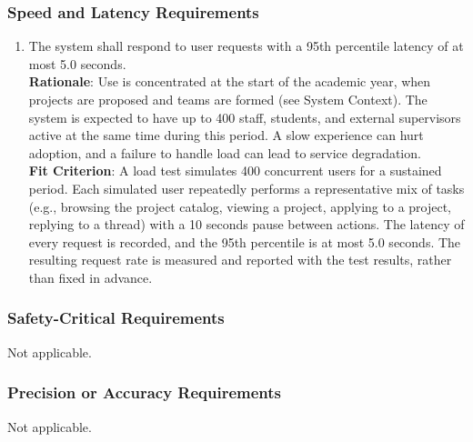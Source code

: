 \documentclass[12pt]{article}
\newcommand{\descriptiveid}[1]{\texttt{\detokenize{#1}}}
\newcommand{\idlabel}[1]{%
  \phantomsection%
  \hypertarget{#1}{\descriptiveid{#1}}
}
\newcounter{tin}
\newcommand{\tailPercentile}{95th}
\newcommand{\tailLatency}{5.0 seconds}
\newcommand{\concurrentUsers}{400}
\newcommand{\thinkTime}{10 seconds}
\begin{document}
  \subsubsection{Speed and Latency Requirements}
  \begin{enumerate}[label=PR-SL\arabic*, ref=PR-SL\arabic*]
    \item[]\idlabel{NFR_PerfTail}\label{NFR_PerfTail} The system shall respond to user requests with a \tailPercentile{} percentile latency of at most \tailLatency{}.\\
    \textbf{Rationale}: Use is concentrated at the start of the academic year, when projects are proposed and teams are formed (see System Context). The system is expected to have up to \concurrentUsers{} staff, students, and external supervisors active at the same time during this period. A slow experience can hurt adoption, and a failure to handle load can lead to service degradation.\\
    \textbf{Fit Criterion}: A load test simulates \concurrentUsers{} concurrent users for a sustained period. Each simulated user repeatedly performs a representative mix of tasks (e.g., browsing the project catalog, viewing a project, applying to a project, replying to a thread) with a \thinkTime{} pause between actions. The latency of every request is recorded, and the \tailPercentile{} percentile is at most \tailLatency{}. The resulting request rate is measured and reported with the test results, rather than fixed in advance.

  \end{enumerate}

  \subsubsection{Safety-Critical Requirements}
  Not applicable.

  \subsubsection{Precision or Accuracy Requirements}
  Not applicable.
\end{document}
